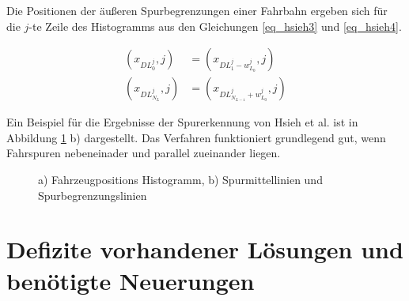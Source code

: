Die Positionen der äußeren Spurbegrenzungen einer Fahrbahn ergeben sich für die $j$-te Zeile des Histogramms
aus den Gleichungen \ref{eq_hsieh3} und \ref{eq_hsieh4}.

\begin{ceqn}
\begin{align}
\label{eq_hsieh3}
    (x_{DL_0^j}, j) &= (x_{DL_1^j - w_{L_0}^j}, j) \\
\label{eq_hsieh4}
    (x_{DL_{N_L}^j}, j) &= (x_{DL_{N_{L-1}}^j + w_{L_0}^j}, j)
\end{align}
\end{ceqn}

Ein Beispiel für die Ergebnisse der Spurerkennung von Hsieh et al. ist in Abbildung \ref{fig:relw_hsieh_results} b) dargestellt.
Das Verfahren funktioniert grundlegend gut, wenn Fahrspuren nebeneinader und parallel zueinander liegen.

\begin{figure}[H]
    \centering
    \caption[Ergebnisse Histogramm Erstellung und Spurextraktion (Hsieh et al.)]{a) Fahrzeugpositions Histogramm, b) Spurmittellinien und Spurbegrenzungslinien \cite[]{Hsieh2006}}
    \label{fig:relw_hsieh_results}
\end{figure}


\section{Defizite vorhandener Lösungen und benötigte Neuerungen}
\label{sec:rw_deficites}


